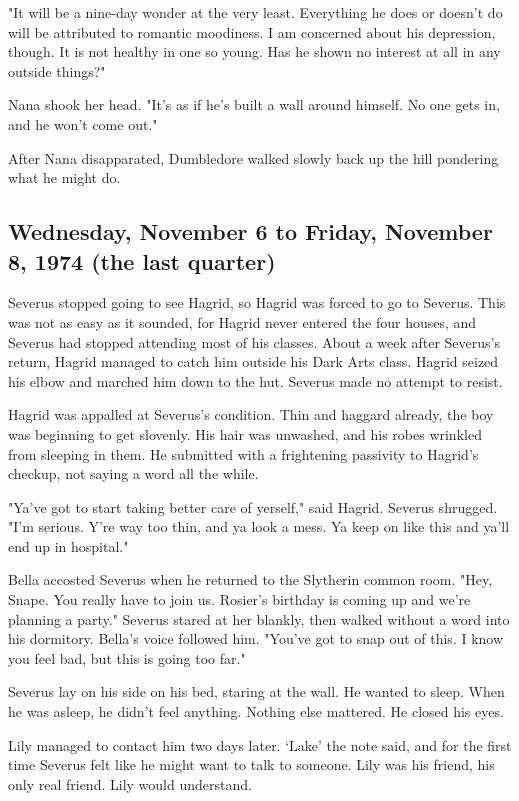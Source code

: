 "It will be a nine-day wonder at the very least. Everything he does or doesn't do will be attributed to romantic moodiness. I am concerned about his depression, though. It is not healthy in one so young. Has he shown no interest at all in any outside things?"

Nana shook her head. "It's as if he's built a wall around himself. No one gets in, and he won't come out."

After Nana disapparated, Dumbledore walked slowly back up the hill pondering what he might do.

\subsection{Wednesday, November 6 to Friday, November 8, 1974 (the last quarter)}

Severus stopped going to see Hagrid, so Hagrid was forced to go to Severus. This was not as easy as it sounded, for Hagrid never entered the four houses, and Severus had stopped attending most of his classes. About a week after Severus's return, Hagrid managed to catch him outside his Dark Arts class. Hagrid seized his elbow and marched him down to the hut. Severus made no attempt to resist.

Hagrid was appalled at Severus's condition. Thin and haggard already, the boy was beginning to get slovenly. His hair was unwashed, and his robes wrinkled from sleeping in them. He submitted with a frightening passivity to Hagrid's checkup, not saying a word all the while.

"Ya've got to start taking better care of yerself," said Hagrid. Severus shrugged. "I'm serious. Y're way too thin, and ya look a mess. Ya keep on like this and ya'll end up in hospital."

Bella accosted Severus when he returned to the Slytherin common room. "Hey, Snape. You really have to join us. Rosier's birthday is coming up and we're planning a party." Severus stared at her blankly, then walked without a word into his dormitory. Bella's voice followed him. "You've got to snap out of this. I know you feel bad, but this is going too far."

Severus lay on his side on his bed, staring at the wall. He wanted to sleep. When he was asleep, he didn't feel anything. Nothing else mattered. He closed his eyes.

Lily managed to contact him two days later. `Lake' the note said, and for the first time Severus felt like he might want to talk to someone. Lily was his friend, his only real friend. Lily would understand.

